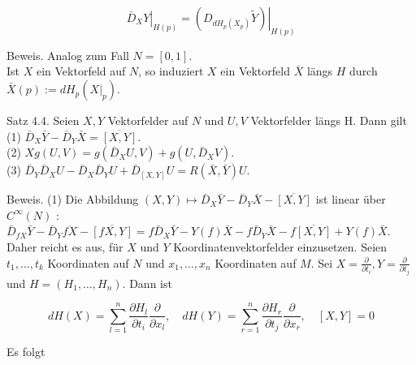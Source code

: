 \documentclass[10pt, letterpaper]{article}
\begin{document}
$$
\left.\bar{D}_{X} Y\right|_{H(p)}=\left.\left(D_{d H_{p}\left(X_{p}\right)} \tilde{Y}\right)\right|_{H(p)}
$$

Beweis. Analog zum Fall $N=[0,1]$.\\
Ist $X$ ein Vektorfeld auf $N$, so induziert $X$ ein Vektorfeld $\bar{X}$ längs $H$ durch $\bar{X}(p):=d H_{p}\left(\left.X\right|_{p}\right)$.

Satz 4.4. Seien $X, Y$ Vektorfelder auf $N$ und $U, V$ Vektorfelder längs H. Dann gilt\\
(1) $\bar{D}_{X} \bar{Y}-\bar{D}_{Y} \bar{X}=\overline{[X, Y]}$.\\
(2) $X g(U, V)=g\left(\bar{D}_{X} U, V\right)+g\left(U, \bar{D}_{X} V\right)$.\\
(3) $\bar{D}_{Y} \bar{D}_{X} U-\bar{D}_{X} \bar{D}_{Y} U+\bar{D}_{[X, Y]} U=R(\bar{X}, \bar{Y}) U$.

Beweis. (1) Die Abbildung $(X, Y) \mapsto \bar{D}_{X} \bar{Y}-\bar{D}_{Y} \bar{X}-\overline{[X, Y]}$ ist linear über $C^{\infty}(N)$ :\\
$\bar{D}_{f X} \bar{Y}-\bar{D}_{Y} \overline{f X}-\overline{[f X, Y]}=f \bar{D}_{X} \bar{Y}-Y(f) \bar{X}-f \bar{D}_{Y} \bar{X}-f \overline{[X, Y]}+Y(f) \bar{X}$.\\
Daher reicht es aus, für $X$ und $Y$ Koordinatenvektorfelder einzusetzen. Seien $t_{1}, \ldots, t_{k}$ Koordinaten auf $N$ und $x_{1}, \ldots, x_{n}$ Koordinaten auf $M$. Sei $X=\frac{\partial}{\partial t_{i}}, Y=\frac{\partial}{\partial t_{j}}$ und $H=\left(H_{1}, \ldots, H_{n}\right)$. Dann ist

$$
d H(X)=\sum_{l=1}^{n} \frac{\partial H_{l}}{\partial t_{i}} \frac{\partial}{\partial x_{l}}, \quad d H(Y)=\sum_{r=1}^{n} \frac{\partial H_{r}}{\partial t_{j}} \frac{\partial}{\partial x_{r}}, \quad[X, Y]=0
$$

Es folgt
\end{document}
